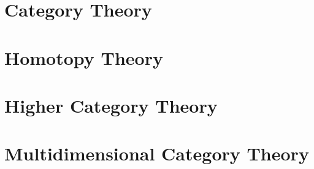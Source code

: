 \documentclass[12pt]{report}
\begin{document}
\chapter{Category Theory}\label{cha:category-theory}

\chapter{Homotopy Theory}\label{cha:homotopy-theory}

\chapter{Higher Category Theory}\label{cha:high-categ-theory}

\chapter{Multidimensional Category Theory}\label{cha:mult-categ-theory}

\printindex
\printbibliography%
\end{document}
